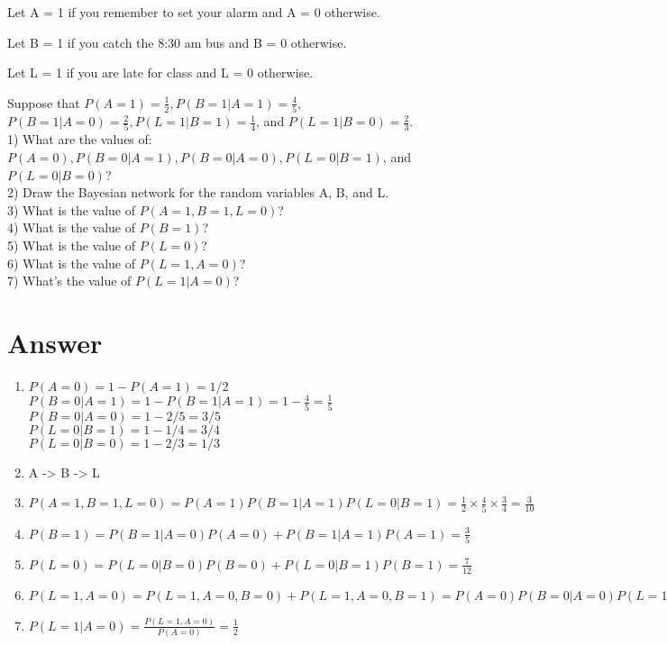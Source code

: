 \documentclass[11pt]{article}
\begin{document}
Let A = 1 if you remember to set your alarm and A = 0 otherwise. 

Let B = 1 if you catch the 8:30 am bus and B = 0 otherwise. 

Let L = 1 if you are late for class and L = 0 otherwise. 

Suppose that $P(A = 1) = \frac{1}{2}, P(B = 1|A = 1) = \frac{4}{5}$, $P(B = 1|A = 0) = \frac{2}{5}, P(L = 1|B = 1) = \frac{1}{4}$, and $P(L = 1|B = 0) = \frac{2}{3}$.
\\1) What are the values of:
$P(A=0), P(B=0|A=1), P(B=0|A=0), P(L=0|B=1)$, and $P(L=0|B=0)$?
\\2) Draw the Bayesian network for the random variables A, B, and L. 
\\3) What is the value of $P(A=1,B=1,L=0)$?
\\4) What is the value of $P(B = 1)$?
\\5) What is the value of $P(L = 0)$?
\\6) What is the value of $P(L=1,A=0)$? 
\\7) What’s the value of $P(L = 1|A = 0)$?

\section{Answer}
\begin{enumerate}
  \item $P(A=0) = 1 - P(A=1) = 1/2$ \\
  $P(B = 0 | A = 1) = 1 - P(B=1| A=1) = 1 - \frac{4}{5} = \frac{1}{5}$ \\
  $P(B = 0 | A = 0) = 1 - 2/5 = 3/5$ \\
  $P(L = 0 | B = 1) = 1 - 1/4 = 3/4$ \\
  $P(L = 0| B = 0) = 1 - 2/3 = 1 / 3$
  \item A -> B -> L
  \item $P(A = 1, B = 1, L = 0) = P(A = 1)P(B = 1 | A = 1)P(L = 0 | B = 1) = \frac{1}{2} \times \frac{4}{5} \times \frac{3}{4} = \frac{3}{10}$
  \item $P(B = 1) = P(B = 1 | A = 0) P(A=0)+P(B = 1 | A = 1) P(A=1) = \frac{3}{5}$
  \item $P(L = 0) = P(L=0 | B = 0)P(B = 0)+P(L=0 | B = 1)P(B = 1) = \frac{7}{12}$
  \item $P(L = 1, A = 0) = P(L = 1, A=0, B=0) + P(L = 1, A = 0, B = 1) = P(A = 0)P(B = 0 | A = 0)P(L=1 | B = 0)+ P(A = 0)P(B=1| A= 0)P(L = 1 | B = 1) = \frac{1}{4}$ 
  \item $P(L = 1|A=0) = \frac{P(L = 1, A=0)}{P(A=0)} = \frac{1}{2}$
\end{enumerate}
\end{document}
